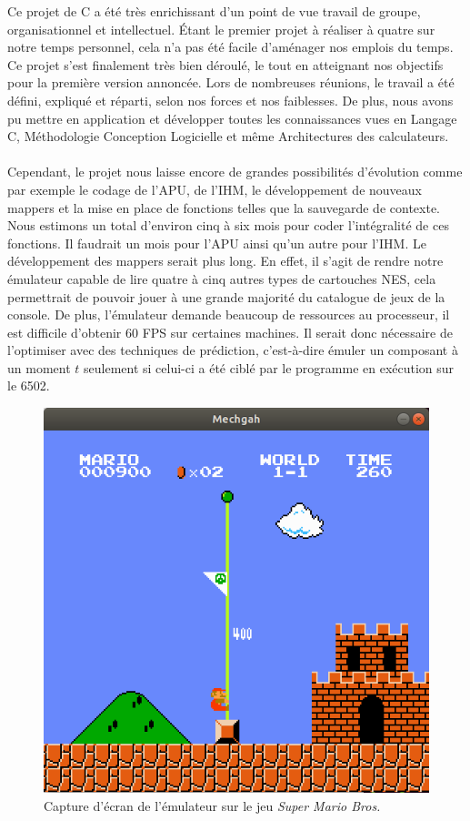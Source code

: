 Ce projet de C a été très enrichissant d'un point de vue travail de groupe, organisationnel et intellectuel. Étant le premier projet à réaliser à quatre sur notre temps personnel, cela n'a pas été facile d'aménager nos emplois du temps. Ce projet s'est finalement très bien déroulé, le tout en atteignant nos objectifs pour la première version annoncée. Lors de nombreuses réunions, le travail a été défini, expliqué et réparti, selon nos forces et nos faiblesses. De plus, nous avons pu mettre en application et développer toutes les connaissances vues en Langage C, Méthodologie Conception Logicielle et même Architectures des calculateurs.

\paragraph{}
 Cependant, le projet nous laisse encore de grandes possibilités d'évolution comme par exemple le codage de l'APU, de l'IHM, le développement de nouveaux mappers et la mise en place de fonctions telles que la sauvegarde de contexte. Nous estimons un total d'environ cinq à six mois pour coder l'intégralité de ces fonctions. Il faudrait un mois pour l'APU ainsi qu'un autre pour l'IHM. Le développement des mappers serait plus long. En effet, il s'agit de rendre notre émulateur capable de lire quatre à cinq autres types de cartouches NES, cela permettrait de pouvoir jouer à une grande majorité du catalogue de jeux de la console. De plus, l'émulateur demande beaucoup de ressources au processeur, il est difficile d'obtenir 60 FPS sur certaines machines. Il serait donc nécessaire de l'optimiser avec des techniques de prédiction, c'est-à-dire émuler un composant à un moment $t$ seulement si celui-ci a été ciblé par le programme en exécution sur le 6502.
\begin{figure}[H]
  \centering
   \includegraphics[width=0.50\linewidth]{images/smb_nes.png}
   \caption{Capture d'écran de l'émulateur sur le jeu \emph{Super Mario Bros.}}
   \label{fig:capture}
\end{figure}
